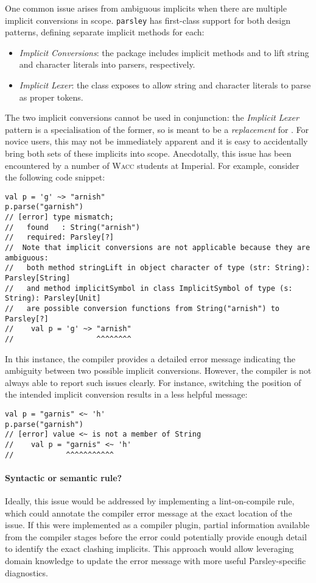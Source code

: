 \documentclass[../../main.tex]{subfiles}
\begin{document}
One common issue arises from ambiguous implicits when there are multiple implicit conversions in scope.
\texttt{parsley} has first-class support for both design patterns, defining separate implicit methods for each:
\begin{itemize}
  \item \emph{Implicit Conversions}: the  package includes implicit methods  and  to lift string and character literals into parsers, respectively.
  \item \emph{Implicit Lexer}: the  class exposes  to allow string and character literals to parse as proper tokens.
\end{itemize}
%
The two implicit conversions cannot be used in conjunction: the \emph{Implicit Lexer} pattern is a specialisation of the former, so  is meant to be a \emph{replacement} for .
For novice users, this may not be immediately apparent and it is easy to accidentally bring both sets of these implicits into scope.
Anecdotally, this issue has been encountered by a number of \textsc{Wacc} students at Imperial.
For example, consider the following code snippet:
\begin{verbatim}
val p = 'g' ~> "arnish"
p.parse("garnish")
// [error] type mismatch;
//   found   : String("arnish")
//   required: Parsley[?]
//  Note that implicit conversions are not applicable because they are ambiguous:
//   both method stringLift in object character of type (str: String): Parsley[String]
//   and method implicitSymbol in class ImplicitSymbol of type (s: String): Parsley[Unit]
//   are possible conversion functions from String("arnish") to Parsley[?]
//    val p = 'g' ~> "arnish"
//                   ^^^^^^^^
\end{verbatim}
%
In this instance, the compiler provides a detailed error message indicating the ambiguity between two possible implicit conversions.
However, the compiler is not always able to report such issues clearly. For instance, switching the position of the intended implicit conversion results in a less helpful message:
\begin{verbatim}
val p = "garnis" <~ 'h'
p.parse("garnish")
// [error] value <~ is not a member of String
//    val p = "garnis" <~ 'h'
//            ^^^^^^^^^^^
\end{verbatim}

\paragraph{Syntactic or semantic rule?}
Ideally, this issue would be addressed by implementing a lint-on-compile rule, which could annotate the compiler error message at the exact location of the issue.
If this were implemented as a compiler plugin, partial information available from the compiler stages before the error could potentially provide enough detail to identify the exact clashing implicits.
This approach would allow leveraging domain knowledge to update the error message with more useful Parsley-specific diagnostics.
\end{document}
